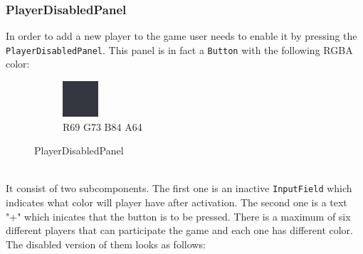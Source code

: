 \subsubsection*{PlayerDisabledPanel}\label{gui-playerdisabledpanel}
\indent In order to add a new player to the game user needs to enable it by pressing the \verb+PlayerDisabledPanel+. This panel is in fact a \verb+Button+ with the following RGBA color:
\begin{figure}[h]
\centering
\begin{subfigure}{\textwidth}
\centering
\includegraphics[]{playerdisabledpanel-color}
\caption*{R69 G73 B84 A64}
\end{subfigure}
\caption{PlayerDisabledPanel} 
\end{figure} \\
\noindent It consist of two subcomponents. The first one is an inactive \verb+InputField+ which indicates what color will player have after activation. The second one is a text "\verb+++" which inicates that the button is to be pressed. There is a maximum of six different players that can participate the game and each one has different color. The disabled version of them looks as follows:

